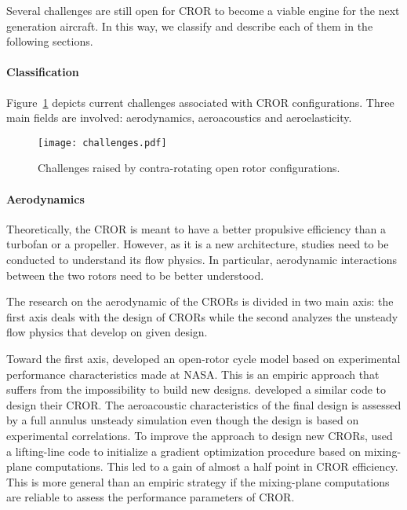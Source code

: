 
Several challenges are still open for CROR
to become a viable engine for the next generation aircraft.
In this way, we classify and describe each of them in the following sections.

\paragraph{Classification}
Figure~\ref{fig:cror_challenges} depicts current challenges associated
with CROR configurations. Three main fields are involved: aerodynamics,
aeroacoustics and aeroelasticity.
\begin{figure}[htp]
  \centering
  \texttt{[image: challenges.pdf]}
  \caption{Challenges raised by contra-rotating open rotor configurations.}
  \label{fig:cror_challenges}
\end{figure}

\paragraph{Aerodynamics}
Theoretically, 
the CROR is meant to have a better propulsive efficiency than a turbofan or a
propeller. However, as it is a new architecture, studies need to be conducted
to understand its flow physics. In particular,
aerodynamic interactions between the two rotors need to be better understood.

The research on the aerodynamic of the CRORs is divided in two main
axis: the first axis deals with the design of CRORs while the second
analyzes the unsteady flow physics that develop on given design.

Toward the first axis, 
\citet{Hendricks2011} developed an open-rotor cycle model based
on experimental performance characteristics made at NASA. This is 
an empiric approach that suffers from the impossibility to build new designs.
\citet{Peters2012} developed a similar code to design their CROR. The aeroacoustic
characteristics of the final design is assessed by a 
full annulus unsteady simulation even though the design is 
based on experimental correlations.
To improve the approach to design new CRORs, 
\citet{Bechet2011} used a lifting-line code to
initialize a gradient optimization procedure based on mixing-plane
computations. This led to a gain of almost a half point
in CROR efficiency. This is more general than an empiric strategy
if the mixing-plane computations are reliable to assess the performance
parameters of CROR. 

